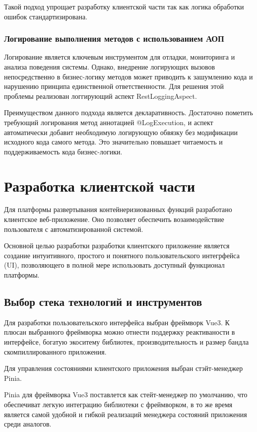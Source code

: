 Такой подход упрощает разработку клиентской части так как логика обработки ошибок стандартизирована.

\subsubsection{Логирование выполнения методов с использованием АОП}

Логирование является ключевым инструментом для отладки, мониторинга и анализа поведения системы.
Однако, внедрение логирующих вызовов непосредственно в бизнес-логику методов может приводить к зашумлению кода и нарушению принципа единственной ответственности.
Для решения этой проблемы реализован логгирующий аспект RestLoggingAspect.

Преимуществом данного подхода является декларативность. Достаточно пометить требующий логирования метод аннотацией @LogExecution, и аспект автоматически добавит необходимую логирующую обвязку без модификации исходного кода самого метода. Это значительно повышает читаемость и поддерживаемость кода бизнес-логики.

\section{Разработка клиентской части}

Для платформы развертывания контейнеризиованных функций разработано клиентское веб-приложение.
Оно позволяет обеспечить возаимодействие пользователя с автоматизированной системой.

Основной целью разработки разработки клиентского приложение является создание интуитивного, простого и понятного пользовательского интегрфейса (UI), позволяющего в полной  мере использовать доступный функционал платформы.

\subsection{Выбор стека технологий и инструментов}

Для разработки пользовательского интерфейса выбран фреймворк Vue3. К плюсан выбранного фреймворка можно отнести поддержку реактиваности в интерфейсе, богатую экоситему библиотек, производительность и размер бандла скомпиллированного приложения.

Для управления состояниями клиентского приложения выбран стэйт-менеджер Pinia.

Pinia для фреймворка Vue3 поставлется как стейт-менеджер по умолчанию, что обеспечиват легкую интеграцию библиотеки с фреймворком, в то же время является самой удобной и гибкой реализаций менеджера состояний приложения среди аналогов.

